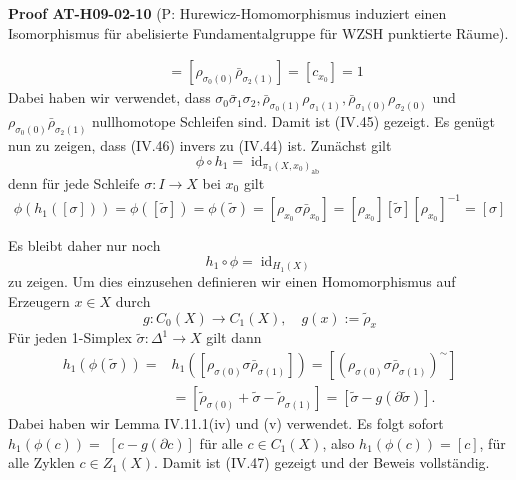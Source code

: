 \documentclass[10pt, letterpaper]{article}
\newcommand{\CustomHeading}[3]{%
  \par\medskip\noindent%
  \textbf{#1 #2} \textnormal{(#3)}.\enskip%
}
\newenvironment{PROOF}[2]{\begin{unitbox}\CustomHeading{Proof}{#1}{#2}}{\end{unitbox}}
\begin{document}
\begin{PROOF}{AT-H09-02-10}{P: Hurewicz-Homomorphismus induziert einen Isomorphismus für abelisierte Fundamentalgruppe für WZSH punktierte Räume}
$$\begin{aligned}
& =\left[\rho_{\sigma_0(0)} \bar{\rho}_{\sigma_2(1)}\right]=\left[c_{x_0}\right]=1
\end{aligned}
$$
Dabei haben wir verwendet, dass $\sigma_0 \bar{\sigma}_1 \sigma_2, \bar{\rho}_{\sigma_0(1)} \rho_{\sigma_1(1)}, \bar{\rho}_{\sigma_1(0)} \rho_{\sigma_2(0)}$ und $\rho_{\sigma_0(0)} \bar{\rho}_{\sigma_2(1)}$ nullhomotope Schleifen sind. Damit ist (IV.45) gezeigt. Es genügt nun zu zeigen, dass (IV.46) invers zu (IV.44) ist. Zunächst gilt
$$
\phi \circ h_1=\operatorname{id}_{\pi_1\left(X, x_0\right)_{\mathrm{ab}}}
$$
denn für jede Schleife $\sigma: I \rightarrow X$ bei $x_0$ gilt
$$
\phi\left(h_1([\sigma])\right)=\phi([\tilde{\sigma}])=\phi(\tilde{\sigma})=\left[\rho_{x_0} \sigma \bar{\rho}_{x_0}\right]=\left[\rho_{x_0}\right][\tilde{\sigma}]\left[\rho_{x_0}\right]^{-1}=[\sigma]
$$

Es bleibt daher nur noch
$$
h_1 \circ \phi=\operatorname{id}_{H_1(X)}
$$
zu zeigen. Um dies einzusehen definieren wir einen Homomorphismus auf Erzeugern $x \in X$ durch
$$
g: C_0(X) \rightarrow C_1(X), \quad g(x):=\tilde{\rho}_x
$$
Für jeden 1-Simplex $\tilde{\sigma}: \Delta^1 \rightarrow X$ gilt dann
$$
\begin{aligned}
h_1(\phi(\tilde{\sigma}))= & h_1\left(\left[\rho_{\sigma(0)} \sigma \bar{\rho}_{\sigma(1)}\right]\right)=\left[\left(\rho_{\sigma(0)} \sigma \bar{\rho}_{\sigma(1)}\right)^{\sim}\right] \\
& =\left[\tilde{\rho}_{\sigma(0)}+\tilde{\sigma}-\tilde{\rho}_{\sigma(1)}\right]=[\tilde{\sigma}-g(\partial \tilde{\sigma})] .
\end{aligned}
$$
Dabei haben wir Lemma IV.11.1(iv) und (v) verwendet. Es folgt sofort $h_1(\phi(c))=$ $[c-g(\partial c)]$ für alle $c \in C_1(X)$, also $h_1(\phi(c))=[c]$, für alle Zyklen $c \in Z_1(X)$. Damit ist (IV.47) gezeigt und der Beweis vollständig.
\end{PROOF}








\pagebreak
\printbibliography
\end{document}
